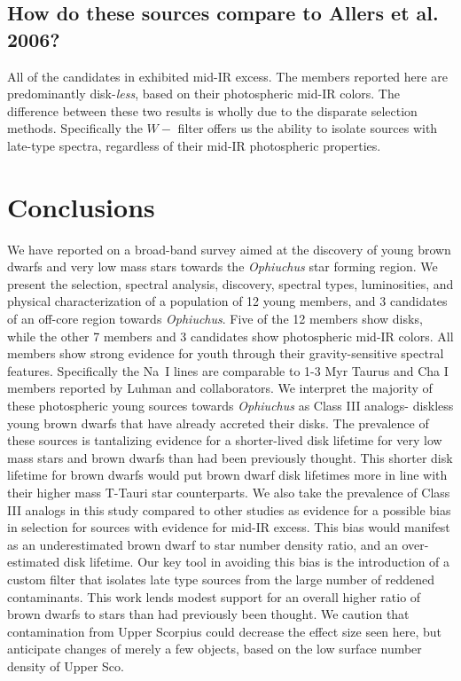 \subsection{How do these sources compare to Allers et al. 2006?}
All of the candidates in \citet{allers06} exhibited mid-IR excess.  The members reported here are predominantly disk-\emph{less}, based on their photospheric mid-IR colors.  The difference between these two results is wholly due to the disparate selection methods.  Specifically the $W-$ filter offers us the ability to isolate sources with late-type spectra, regardless of their mid-IR photospheric properties.  


\section{Conclusions}

We have reported on a broad-band survey aimed at the discovery of young brown dwarfs and very low mass stars towards the \emph{Ophiuchus} star forming region.  We present the selection, spectral analysis, discovery, spectral types, luminosities, and physical characterization of a population of 12 young members, and 3 candidates of an off-core region towards \emph{Ophiuchus}.  Five of the 12 members show disks, while the other 7 members and 3 candidates show photospheric mid-IR colors.  All members show strong evidence for youth through their gravity-sensitive spectral features.  Specifically the Na~I lines are comparable to 1-3 Myr Taurus and Cha I members reported by Luhman and collaborators.  We interpret the majority of these photospheric young sources towards \emph{Ophiuchus} as Class III analogs- diskless young brown dwarfs that have already accreted their disks.  The prevalence of these sources is tantalizing evidence for a shorter-lived disk lifetime for very low mass stars and brown dwarfs than had been previously thought.  This shorter disk lifetime for brown dwarfs would put brown dwarf disk lifetimes more in line with their higher mass T-Tauri star counterparts.  We also take the prevalence of Class III analogs in this study compared to other studies as evidence for a possible bias in selection for sources with evidence for mid-IR excess.  This bias would manifest as an underestimated brown dwarf to star number density ratio, and an over-estimated disk lifetime.  Our key tool in avoiding this bias is the introduction of a custom filter that isolates late type sources from the large number of reddened contaminants.  This work lends modest support for an overall higher ratio of brown dwarfs to stars than had previously been thought.  We caution that contamination from Upper Scorpius could decrease the effect size seen here, but anticipate changes of merely a few objects, based on the low surface number density of Upper Sco.

